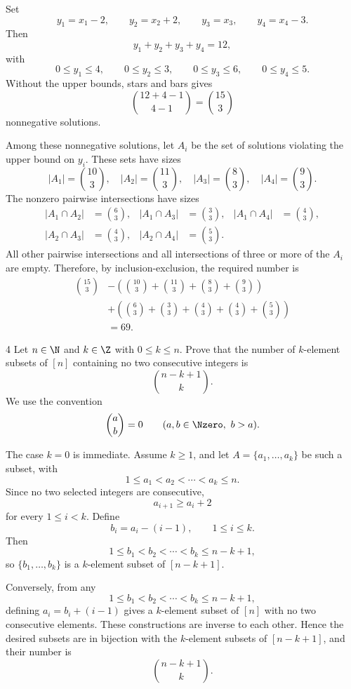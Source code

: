 \documentclass[11pt,oneside]{article}
\begin{document}
\begin{solution}
Set
\[
    y_1=x_1-2,
    \qquad
    y_2=x_2+2,
    \qquad
    y_3=x_3,
    \qquad
    y_4=x_4-3.
\]
Then
\[
    y_1+y_2+y_3+y_4=12,
\]
with
\[
    0\leq y_1\leq4,
    \qquad
    0\leq y_2\leq3,
    \qquad
    0\leq y_3\leq6,
    \qquad
    0\leq y_4\leq5.
\]
Without the upper bounds, stars and bars gives
\[
    \binom{12+4-1}{4-1}=\binom{15}{3}
\]
nonnegative solutions.

Among these nonnegative solutions, let $A_i$ be the set of solutions violating the upper bound on $y_i$. These sets have sizes
\[
    |A_1|=\binom{10}{3},
    \quad
    |A_2|=\binom{11}{3},
    \quad
    |A_3|=\binom{8}{3},
    \quad
    |A_4|=\binom{9}{3}.
\]
The nonzero pairwise intersections have sizes
\[
\begin{aligned}
    |A_1\cap A_2|&=\binom{6}{3},&
    |A_1\cap A_3|&=\binom{3}{3},&
    |A_1\cap A_4|&=\binom{4}{3},\\
    |A_2\cap A_3|&=\binom{4}{3},&
    |A_2\cap A_4|&=\binom{5}{3}.&&
\end{aligned}
\]
All other pairwise intersections and all intersections of three or more of the $A_i$ are empty. Therefore, by inclusion-exclusion, the required number is
\[
\begin{aligned}
    \binom{15}{3}
    &-\left(
        \binom{10}{3}+\binom{11}{3}+\binom{8}{3}+\binom{9}{3}
      \right)\\
    &+\left(
        \binom{6}{3}+\binom{3}{3}+\binom{4}{3}
        +\binom{4}{3}+\binom{5}{3}
      \right)\\
    &=69.
\end{aligned}
\]
\end{solution}

\begin{problem}{4}
Let $n\in\N$ and $k\in\Z$ with $0\leq k\leq n$. Prove that the number of $k$-element subsets of $[n]$ containing no two consecutive integers is
\[
    \binom{n-k+1}{k}.
\]
We use the convention
\[
    \binom{a}{b}=0
    \qquad (a,b\in\Nzero,\ b>a).
\]
\end{problem}

\begin{solution}
The case $k=0$ is immediate. Assume $k\geq1$, and let $A=\{a_1,\ldots,a_k\}$ be such a subset, with
\[
    1\leq a_1<a_2<\cdots<a_k\leq n.
\]
Since no two selected integers are consecutive,
\[
    a_{i+1}\geq a_i+2
\]
for every $1\leq i<k$. Define
\[
    b_i=a_i-(i-1),
    \qquad 1\leq i\leq k.
\]
Then
\[
    1\leq b_1<b_2<\cdots<b_k\leq n-k+1,
\]
so $\{b_1,\ldots,b_k\}$ is a $k$-element subset of $[n-k+1]$.

Conversely, from any
\[
    1\leq b_1<b_2<\cdots<b_k\leq n-k+1,
\]
defining $a_i=b_i+(i-1)$ gives a $k$-element subset of $[n]$ with no two consecutive elements. These constructions are inverse to each other. Hence the desired subsets are in bijection with the $k$-element subsets of $[n-k+1]$, and their number is
\[
    \binom{n-k+1}{k}.
\]
\end{solution}
\end{document}
